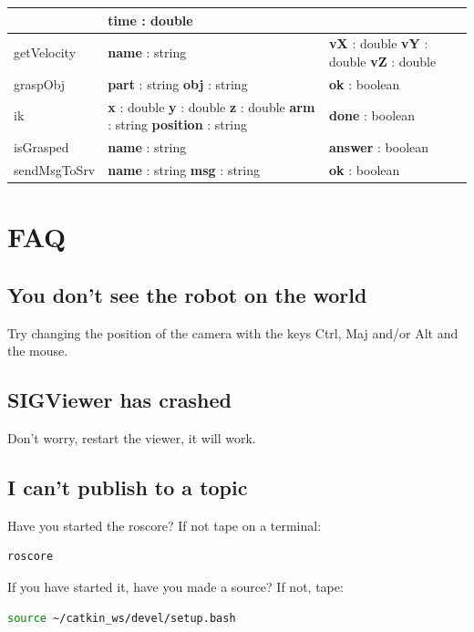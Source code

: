 \documentclass[notitlepage]{report}
\begin{document}
\begin{supertabular}{|p{3cm}|p{4cm}|p{4cm}|}
  		&
  		\textbf{time} : double\\
  	\hline
  	getVelocity & 
  		\textbf{name} : string
  		&
  		\textbf{vX} : double\newline
  		\textbf{vY} : double\newline
  		\textbf{vZ} : double\\
  	\hline
  	graspObj & 
  		\textbf{part} : string\newline
  		\textbf{obj} : string
  		&
  		\textbf{ok} : boolean\\
  	\hline
  	ik & 
  		\textbf{x} : double\newline
  		\textbf{y} : double\newline
  		\textbf{z} : double\newline
  		\textbf{arm} : string\newline
  		\textbf{position} : string
  		&
  		\textbf{done} : boolean\\
  	\hline
  	isGrasped & 
  		\textbf{name} : string
  		&
  		\textbf{answer} : boolean\\
  	\hline
  	sendMsgToSrv & 
  		\textbf{name} : string\newline
  		\textbf{msg} : string
  		&
  		\textbf{ok} : boolean\\
  	\hline
\end{supertabular}

\chapter{FAQ}
\section*{You don't see the robot on the world}
Try changing the position of the camera with the keys Ctrl, Maj and/or Alt and the mouse.
\section*{SIGViewer has crashed}
Don't worry, restart the viewer, it will work.

\section*{I can't publish to a topic}
Have you started the roscore? If not tape on a terminal:
\begin{lstlisting}[language=bash]
roscore
\end{lstlisting} 
If you have started it, have you made a source? If not, tape:
\begin{lstlisting}[language=bash]
source ~/catkin_ws/devel/setup.bash
\end{lstlisting} 
\end{document}
